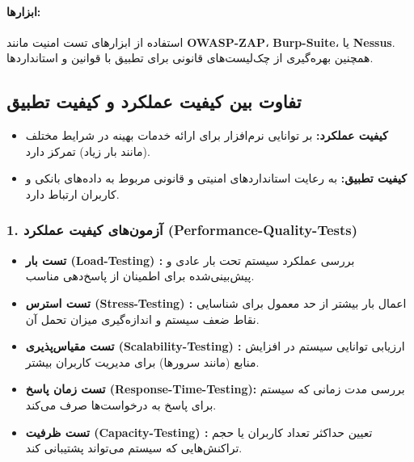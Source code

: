 \paragraph{ابزارها:}
استفاده از ابزارهای تست امنیت مانند \textbf{OWASP-ZAP}، \textbf{Burp-Suite}، یا \textbf{Nessus}. همچنین بهره‌گیری از چک‌لیست‌های قانونی برای تطبیق با قوانین و استانداردها.

\subsection*{تفاوت بین کیفیت عملکرد و کیفیت تطبیق}
\begin{itemize}
	\item \textbf{کیفیت عملکرد:} بر توانایی نرم‌افزار برای ارائه خدمات بهینه در شرایط مختلف (مانند بار زیاد) تمرکز دارد.
	\item \textbf{کیفیت تطبیق:} به رعایت استانداردهای امنیتی و قانونی مربوط به داده‌های بانکی و کاربران ارتباط دارد.
\end{itemize}




\subsubsection*{1. آزمون‌های کیفیت عملکرد (Performance-Quality-Tests)}
\begin{itemize}
	\item \textbf{تست بار (Load-Testing) :} بررسی عملکرد سیستم تحت بار عادی و پیش‌بینی‌شده برای اطمینان از پاسخ‌دهی مناسب.
	\item \textbf{تست استرس (Stress-Testing) :} اعمال بار بیشتر از حد معمول برای شناسایی نقاط ضعف سیستم و اندازه‌گیری میزان تحمل آن.
	\item \textbf{تست مقیاس‌پذیری (Scalability-Testing) :} ارزیابی توانایی سیستم در افزایش منابع (مانند سرورها) برای مدیریت کاربران بیشتر.
	\item \textbf{تست زمان پاسخ (Response-Time-Testing):} بررسی مدت زمانی که سیستم برای پاسخ به درخواست‌ها صرف می‌کند.
	\item \textbf{تست ظرفیت (Capacity-Testing) :} تعیین حداکثر تعداد کاربران یا حجم تراکنش‌هایی که سیستم می‌تواند پشتیبانی کند.
\end{itemize}

